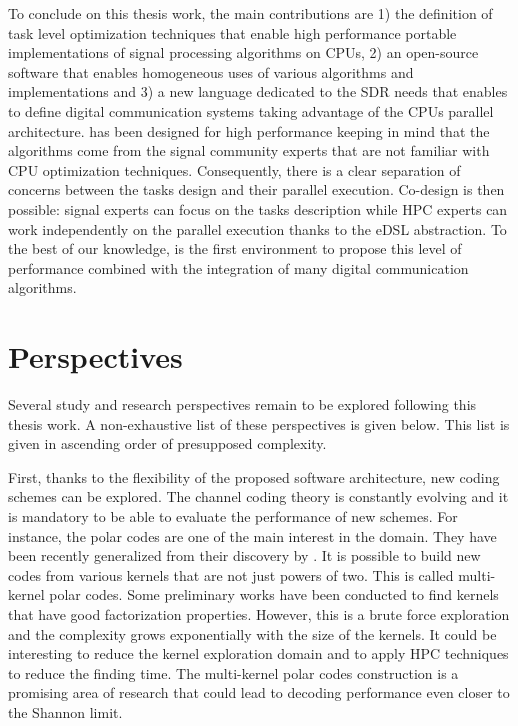 To conclude on this thesis work, the main contributions are 1) the definition of
task level optimization techniques that enable high performance portable
implementations of signal processing algorithms on CPUs, 2) an open-source
software that enables homogeneous uses of various algorithms and implementations
and 3) a new language dedicated to the SDR needs that enables to define digital
communication systems taking advantage of the CPUs parallel architecture.
\AFFECT has been designed for high performance keeping in mind that the
algorithms come from the signal community experts that are not familiar with CPU
optimization techniques. Consequently, there is a clear separation of concerns
between the tasks design and their parallel execution. Co-design is then
possible: signal experts can focus on the tasks description while HPC experts
can work independently on the parallel execution thanks to the eDSL abstraction.
To the best of our knowledge, \AFFECT is the first environment to propose this
level of performance combined with the integration of many digital communication
algorithms.

\section*{Perspectives}

Several study and research perspectives remain to be explored following this
thesis work. A non-exhaustive list of these perspectives is given below. This
list is given in ascending order of presupposed complexity.

First, thanks to the flexibility of the proposed software architecture, new
coding schemes can be explored. The channel coding theory is constantly evolving
and it is mandatory to be able to evaluate the performance of new schemes. For
instance, the polar codes are one of the main interest in the domain. They have
been recently generalized from their discovery by \Arikan. It is possible to
build new codes from various kernels that are not just powers of two. This is
called multi-kernel polar codes. Some preliminary works have been conducted to
find kernels that have good factorization properties. However, this is a brute
force exploration and the complexity grows exponentially with the size of the
kernels. It could be interesting to reduce the kernel exploration domain and to
apply HPC techniques to reduce the finding time. The multi-kernel polar codes
construction is a promising area of research that could lead to decoding
performance even closer to the Shannon limit.

